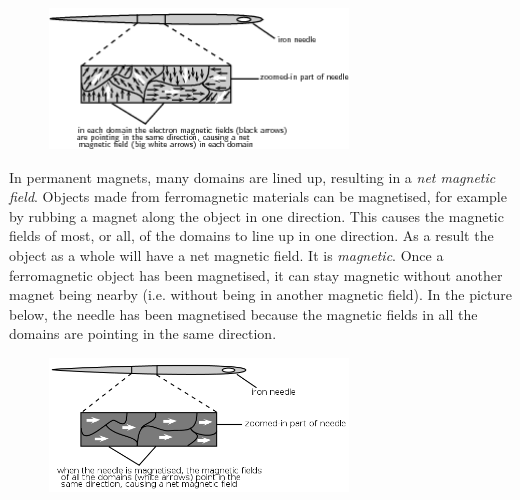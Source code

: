 	\begin{figure}[H] %
    \begin{center}
    \label{m37830*id128374!!!underscore!!!media}\label{m37830*id128374!!!underscore!!!printimage}\includegraphics[width=300px]{col11305.imgs/m37830_PG10C7_002.png} %
        
      \vspace{2pt}
    \vspace{.1in}
    
    \end{center}

 \end{figure}   

    \addtocounter{footnote}{-0}
    
      \par 
      \label{m37830*id128380}In permanent magnets, many domains are lined up, resulting in a \textsl{net magnetic field}.
Objects made from ferromagnetic materials can be magnetised, for example by rubbing a magnet
along the object in one direction. This causes the magnetic fields of most, or all, of the domains to line up in one direction. As a result the object as a whole will have a net magnetic field. It is \textsl{magnetic}. Once a ferromagnetic object has been magnetised, it can stay magnetic without another magnet being nearby (i.e. without being in another magnetic field). In the picture below, the needle has been magnetised because the magnetic fields in all the domains are pointing in the same direction.\par 
      \label{m37830*id128400}
        
    \setcounter{subfigure}{0}


	\begin{figure}[H] %
    \begin{center}
    \label{m37830*id128403!!!underscore!!!media}\label{m37830*id128403!!!underscore!!!printimage}\includegraphics[width=300px]{col11305.imgs/m37830_PG10C7_003.png} %
        
      \vspace{2pt}
    \vspace{.1in}
    
    \end{center}

 \end{figure}   

